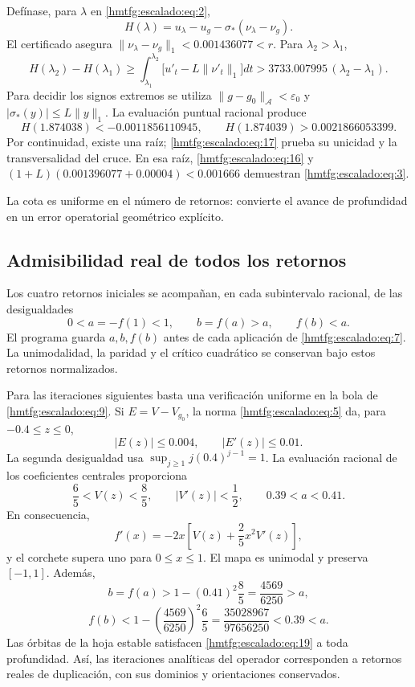 Defínase, para \(\lambda\) en \eqref{hmtfg:escalado:eq:2},
\[
H(\lambda)=u_\lambda-u_g-
\sigma_*(\nu_\lambda-\nu_g).
\]
El certificado asegura \(\|\nu_\lambda-\nu_g\|_1<0.001436077<r\). Para \(\lambda_2>\lambda_1\),
\begin{equation}
H(\lambda_2)-H(\lambda_1)
\ge\int_{\lambda_1}^{\lambda_2}
\bigl[u'_t-L\|\nu'_t\|_1\bigr]dt
>3733.007995\,(\lambda_2-\lambda_1).
\label{hmtfg:escalado:eq:17}
\end{equation}
Para decidir los signos extremos se utiliza \(\|g-g_0\|_{\mathcal A}<\varepsilon_0\) y \(|\sigma_*(y)|\le L\|y\|_1\). La evaluación puntual racional produce
\begin{equation}
H(1.874038)<-0.0011856110945,
\qquad H(1.874039)>0.0021866053399.
\label{hmtfg:escalado:eq:18}
\end{equation}
Por continuidad, existe una raíz; \eqref{hmtfg:escalado:eq:17} prueba su unicidad y la transversalidad del cruce. En esa raíz, \eqref{hmtfg:escalado:eq:16} y
\((1+L)(0.001396077+0.00004)<0.001666\)
demuestran \eqref{hmtfg:escalado:eq:3}.

La cota es uniforme en el número de retornos: convierte el avance de profundidad en un error operatorial geométrico explícito.


\subsection{Admisibilidad real de todos los retornos}
\label{hmtfg:escalado:7}

Los cuatro retornos iniciales se acompañan, en cada subintervalo racional, de las desigualdades
\begin{equation}
0<a=-f(1)<1,\qquad b=f(a)>a,\qquad f(b)<a.
\label{hmtfg:escalado:eq:19}
\end{equation}
El programa guarda \(a,b,f(b)\) antes de cada aplicación de \eqref{hmtfg:escalado:eq:7}. La unimodalidad, la paridad y el crítico cuadrático se conservan bajo estos retornos normalizados.

Para las iteraciones siguientes basta una verificación uniforme en la bola de \eqref{hmtfg:escalado:eq:9}. Si \(E=V-V_{g_0}\), la norma \eqref{hmtfg:escalado:eq:5} da, para \(-0.4\le z\le0\),
\[
|E(z)|\le0.004,\qquad |E'(z)|\le0.01.
\]
La segunda desigualdad usa \(\sup_{j\ge1}j(0.4)^{j-1}=1\). La evaluación racional de los coeficientes centrales proporciona
\begin{equation}
\frac65<V(z)<\frac85,\qquad |V'(z)|<\frac12,
\qquad 0.39<a<0.41.
\label{hmtfg:escalado:eq:20}
\end{equation}
En consecuencia,
\[
f'(x)=-2x\left[V(z)+\frac25x^2V'(z)\right],
\]
y el corchete supera uno para \(0\le x\le1\). El mapa es unimodal y preserva \([-1,1]\). Además,
\[
b=f(a)>1-(0.41)^2\frac85=\frac{4569}{6250}>a,
\]
\begin{equation}
f(b)<1-\left(\frac{4569}{6250}\right)^2\frac65
=\frac{35028967}{97656250}<0.39<a.
\label{hmtfg:escalado:eq:21}
\end{equation}
Las órbitas de la hoja estable satisfacen \eqref{hmtfg:escalado:eq:19} a toda profundidad. Así, las iteraciones analíticas del operador corresponden a retornos reales de duplicación, con sus dominios y orientaciones conservados.



